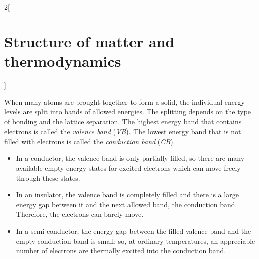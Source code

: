 \documentclass[../../../main_physics.tex]{subfiles}
\begin{document}
\begin{multicols}{2}[\section{Structure of matter and thermodynamics}]
\begin{definition}
\begin{center}
      \begin{minipage}{\linewidth}
        \centering
        
      \end{minipage}
    \end{center}
  \end{definition}
  \begin{proposition}
    When many atoms are brought together to form a solid, the individual energy levels are split into bands of allowed energies. The splitting depends on the type of bonding and the lattice separation. The highest energy band that contains electrons is called the \emph{valence band} (\emph{VB}). The lowest energy band that is not filled with electrons is called the \emph{conduction band} (\emph{CB}).
    \begin{center}
      \begin{minipage}{\linewidth}
        \centering
        
      \end{minipage}
    \end{center}
    \begin{itemize}
      \item In a conductor, the valence band is only partially filled, so there are many available empty energy states for excited electrons which can move freely through these states.
      \item In an insulator, the valence band is completely filled and there is a large energy gap between it and the next allowed band, the conduction band. Therefore, the electrons can barely move.
      \item In a semi-conductor, the energy gap between the filled valence band and the empty conduction band is small; so, at ordinary temperatures, an appreciable number of electrons are thermally excited into the conduction band.
    \end{itemize}
  \end{proposition}
\end{multicols}
\begin{center}
  \begin{minipage}{\linewidth}
    \centering
    
  \end{minipage}
\end{center}
\end{document}

